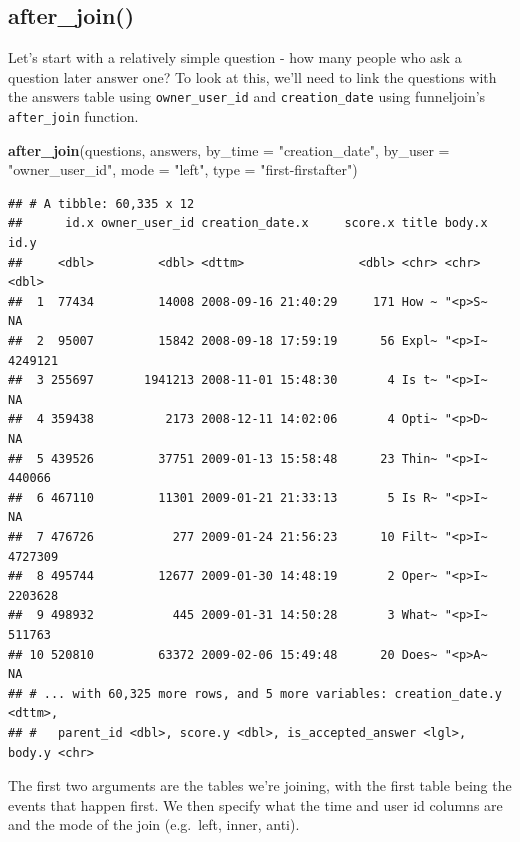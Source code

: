 \documentclass[]{article}
\newenvironment{Shaded}{\begin{snugshade}}{\end{snugshade}}
\newcommand{\KeywordTok}[1]{\textcolor[rgb]{0.13,0.29,0.53}{\textbf{#1}}}
\newcommand{\DataTypeTok}[1]{\textcolor[rgb]{0.13,0.29,0.53}{#1}}
\newcommand{\StringTok}[1]{\textcolor[rgb]{0.31,0.60,0.02}{#1}}
\newcommand{\NormalTok}[1]{#1}
\begin{document}
\subsection{after\_join()}\label{after_join}

Let's start with a relatively simple question - how many people who ask
a question later answer one? To look at this, we'll need to link the
questions with the answers table using \texttt{owner\_user\_id} and
\texttt{creation\_date} using funneljoin's \texttt{after\_join}
function.

\begin{Shaded}
\begin{Highlighting}[]
\KeywordTok{after_join}\NormalTok{(questions, }
\NormalTok{           answers,}
           \DataTypeTok{by_time =} \StringTok{"creation_date"}\NormalTok{,}
           \DataTypeTok{by_user =} \StringTok{"owner_user_id"}\NormalTok{,}
           \DataTypeTok{mode =} \StringTok{"left"}\NormalTok{,}
           \DataTypeTok{type =} \StringTok{"first-firstafter"}\NormalTok{)}
\end{Highlighting}
\end{Shaded}

\begin{verbatim}
## # A tibble: 60,335 x 12
##      id.x owner_user_id creation_date.x     score.x title body.x    id.y
##     <dbl>         <dbl> <dttm>                <dbl> <chr> <chr>    <dbl>
##  1  77434         14008 2008-09-16 21:40:29     171 How ~ "<p>S~      NA
##  2  95007         15842 2008-09-18 17:59:19      56 Expl~ "<p>I~ 4249121
##  3 255697       1941213 2008-11-01 15:48:30       4 Is t~ "<p>I~      NA
##  4 359438          2173 2008-12-11 14:02:06       4 Opti~ "<p>D~      NA
##  5 439526         37751 2009-01-13 15:58:48      23 Thin~ "<p>I~  440066
##  6 467110         11301 2009-01-21 21:33:13       5 Is R~ "<p>I~      NA
##  7 476726           277 2009-01-24 21:56:23      10 Filt~ "<p>I~ 4727309
##  8 495744         12677 2009-01-30 14:48:19       2 Oper~ "<p>I~ 2203628
##  9 498932           445 2009-01-31 14:50:28       3 What~ "<p>I~  511763
## 10 520810         63372 2009-02-06 15:49:48      20 Does~ "<p>A~      NA
## # ... with 60,325 more rows, and 5 more variables: creation_date.y <dttm>,
## #   parent_id <dbl>, score.y <dbl>, is_accepted_answer <lgl>, body.y <chr>
\end{verbatim}

The first two arguments are the tables we're joining, with the first
table being the events that happen first. We then specify what the time
and user id columns are and the mode of the join (e.g.~left, inner,
anti).
\end{document}
